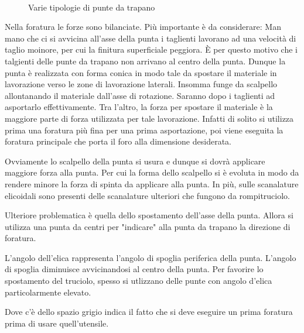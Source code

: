 \begin{figure}
\centering
{}\\
\quad
{}
\caption{Varie tipologie di punte da trapano}
\label{fig:Punte}
\end{figure}

Nella foratura le forze sono bilanciate. Più importante è da considerare:
Man mano che ci si avvicina all'asse della punta i taglienti lavorano ad una velocità di taglio
moinore, per cui la finitura superficiale peggiora.
È per questo motivo che i talgienti delle punte da trapano non arrivano al centro della punta.
Dunque la punta è realizzata con forma conica in modo tale da spostare il materiale in lavorazione 
verso le zone di lavorazione laterali. Insomma funge da scalpello allontanando il materiale
dall'asse di rotazione. Saranno dopo i taglienti ad asportarlo effettivamente. 
Tra l'altro, la forza per spostare il materiale è la maggiore parte di forza utilizzata per tale lavorazione.
Infatti di solito si utilizza prima una foratura più fina per una prima asportazione, poi viene 
eseguita la foratura principale che porta il foro alla dimensione desiderata.

Ovviamente lo scalpello della punta si usura e dunque si dovrà applicare maggiore forza alla punta.
Per cui la forma dello scalpello si è evoluta in modo da rendere minore la forza di spinta da applicare alla 
punta. In più, sulle scanalature elicoidali sono presenti delle scanalature ulteriori che fungono da 
rompitruciolo.

Ulteriore problematica è quella dello spostamento dell'asse della punta. Allora si utilizza una punta
da centri per "indicare" alla punta da trapano la direzione di foratura.

L'angolo dell'elica rappresenta l'angolo di spoglia periferica della punta.
L'angolo di spoglia diminuisce avvicinandosi al centro della punta.
Per favorire lo spostamento del truciolo, spesso si utlizzano delle punte con angolo d'elica particolarmente 
elevato.

Dove c'è dello spazio grigio indica il fatto che si deve eseguire un prima foratura prima di usare 
quell'utensile.

